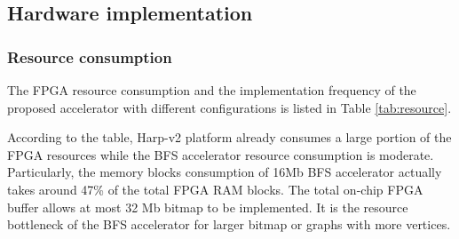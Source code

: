 %



\subsection{Hardware implementation}
\subsubsection{Resource consumption}
The FPGA resource consumption and the implementation frequency of 
the proposed accelerator with different configurations 
is listed in Table \ref{tab:resource}. 

According to the table, Harp-v2 platform already consumes 
a large portion of the FPGA resources while the BFS accelerator resource 
consumption is moderate. Particularly, the memory blocks consumption of 
16Mb BFS accelerator actually takes around 47\% of the total FPGA 
RAM blocks. The total on-chip FPGA buffer allows at most 32 Mb bitmap 
to be implemented. It is the resource bottleneck of the BFS 
accelerator for larger bitmap or graphs with more vertices.

